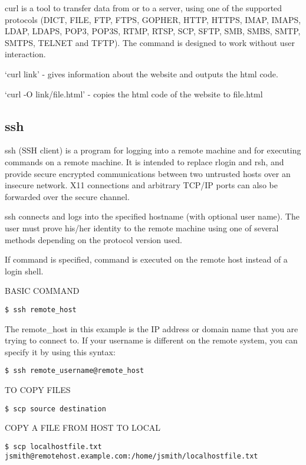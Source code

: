 \documentclass{article}
\begin{document}
curl is a tool to transfer data from or to a server, using one of the supported protocols (DICT, FILE, FTP, FTPS, GOPHER, HTTP, HTTPS, IMAP, IMAPS, LDAP, LDAPS, POP3, POP3S, RTMP, RTSP, SCP, SFTP, SMB, SMBS, SMTP, SMTPS, TELNET and TFTP). The command is designed to work without user interaction.

`curl link' - gives information about the website and outputs the html code.

`curl -O link/file.html' - copies the html code of the website to file.html

\subsection{ssh}

     ssh (SSH client) is a program for logging into a remote machine and for
     executing commands on a remote machine.  It is intended to replace rlogin
     and rsh, and provide secure encrypted communications between two
     untrusted hosts over an insecure network.  X11 connections and arbitrary
     TCP/IP ports can also be forwarded over the secure channel.

     ssh connects and logs into the specified hostname (with optional user
     name).  The user must prove his/her identity to the remote machine using
     one of several methods depending on the protocol version used.

     If command is specified, command is executed on the remote host instead
     of a login shell.
    
BASIC COMMAND

\begin{verbatim}
$ ssh remote_host
\end{verbatim}
\hspace{10mm}The remote\_host in this example is the IP address or domain name that you are trying to connect to.
If your username is different on the remote system, you can specify it by using this syntax:
\begin{verbatim}
$ ssh remote_username@remote_host
\end{verbatim}

TO COPY FILES
\begin{verbatim}
$ scp source destination
\end{verbatim}

COPY A FILE FROM HOST TO LOCAL

\begin{verbatim}
$ scp localhostfile.txt jsmith@remotehost.example.com:/home/jsmith/localhostfile.txt
\end{verbatim}
\end{document}
